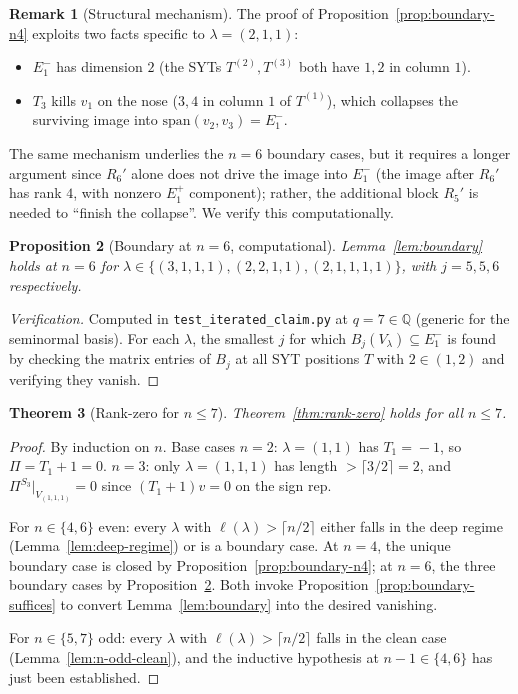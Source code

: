 \documentclass[11pt]{article}
\newtheorem{theorem}{Theorem}
\newtheorem{proposition}[theorem]{Proposition}
\theoremstyle{definition}
\newtheorem{remark}[theorem]{Remark}
\begin{document}
\begin{remark}[Structural mechanism]
The proof of Proposition~\ref{prop:boundary-n4} exploits two facts
specific to $\lambda=(2,1,1)$:
\begin{itemize}[leftmargin=2em,topsep=0.3em,itemsep=0.2em]
\item $E_1^-$ has dimension $2$ (the SYTs $T^{(2)},T^{(3)}$ both
have $1,2$ in column $1$).
\item $T_3$ kills $v_1$ on the nose ($3,4$ in column $1$ of $T^{(1)}$),
which collapses the surviving image into $\mathrm{span}(v_2,v_3)=E_1^-$.
\end{itemize}
The same mechanism underlies the $n=6$ boundary cases, but it
requires a longer argument since $R_6'$ alone does not drive the
image into $E_1^-$ (the image after $R_6'$ has rank $4$, with
nonzero $E_1^+$ component); rather, the additional block $R_5'$ is
needed to ``finish the collapse''. We verify this computationally.
\end{remark}

\begin{proposition}[Boundary at $n=6$, computational]\label{prop:boundary-n6}
Lemma~\ref{lem:boundary} holds at $n=6$ for
$\lambda\in\{(3,1,1,1),(2,2,1,1),(2,1,1,1,1)\}$, with
$j=5,5,6$ respectively.
\end{proposition}

\begin{proof}[Verification]
Computed in \texttt{test\_iterated\_claim.py} at $q=7\in\mathbb{Q}$
(generic for the seminormal basis). For each $\lambda$, the smallest
$j$ for which $B_j(V_\lambda)\subseteq E_1^-$ is found by checking
the matrix entries of $B_j$ at all SYT positions $T$ with $2\in(1,2)$
and verifying they vanish.
\end{proof}

\begin{theorem}[Rank-zero for $n\le 7$]\label{thm:n7}
Theorem~\ref{thm:rank-zero} holds for all $n\le 7$.
\end{theorem}

\begin{proof}
By induction on $n$. Base cases $n=2$: $\lambda=(1,1)$ has
$T_1\!=\!-1$, so $\Pi=T_1{+}1=0$. $n=3$: only $\lambda=(1,1,1)$ has
length $>\lceil 3/2\rceil=2$, and $\Pi^{S_3}|_{V_{(1,1,1)}}=0$ since
$(T_1{+}1)v=0$ on the sign rep.

For $n\in\{4,6\}$ even: every $\lambda$ with $\ell(\lambda)>\lceil n/2\rceil$
either falls in the deep regime (Lemma~\ref{lem:deep-regime}) or
is a boundary case. At $n=4$, the unique boundary case is closed by
Proposition~\ref{prop:boundary-n4}; at $n=6$, the three boundary
cases by Proposition~\ref{prop:boundary-n6}. Both invoke
Proposition~\ref{prop:boundary-suffices} to convert
Lemma~\ref{lem:boundary} into the desired vanishing.

For $n\in\{5,7\}$ odd: every $\lambda$ with $\ell(\lambda)>\lceil n/2\rceil$
falls in the clean case (Lemma~\ref{lem:n-odd-clean}), and the
inductive hypothesis at $n-1\in\{4,6\}$ has just been established.
\end{proof}
\end{document}
